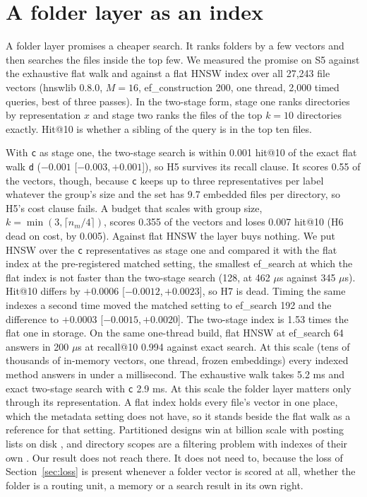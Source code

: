 \documentclass[11pt]{article}
\newcommand{\rep}[1]{\texttt{#1}}
\newcommand{\ci}[2]{[\ensuremath{#1},\,\ensuremath{#2}]}  %
\begin{document}
\section{A folder layer as an index}
\label{sec:systems}

A folder layer promises a cheaper search. It ranks folders by a few vectors and then searches the files inside the top few. We measured the promise on S5 against the exhaustive flat walk and against a flat HNSW index \citep{malkov2020hnsw} over all 27,243 file vectors (hnswlib 0.8.0, $M = 16$, ef\_construction 200, one thread, 2,000 timed queries, best of three passes). In the two-stage form, stage one ranks directories by representation $x$ and stage two ranks the files of the top $k = 10$ directories exactly. Hit@10 is whether a sibling of the query is in the top ten files.

With \rep{c} as stage one, the two-stage search is within 0.001 hit@10 of the exact flat walk \rep{d} ($-0.001$ \ci{-0.003}{+0.001}), so H5 survives its recall clause. It scores 0.55 of the vectors, though, because \rep{c} keeps up to three representatives per label whatever the group's size and the set has 9.7 embedded files per directory, so H5's cost clause fails. A budget that scales with group size, $k = \min(3, \lceil n_m / 4 \rceil)$, scores 0.355 of the vectors and loses 0.007 hit@10 (H6 dead on cost, by 0.005). Against flat HNSW the layer buys nothing. We put HNSW over the \rep{c} representatives as stage one and compared it with the flat index at the pre-registered matched setting, the smallest ef\_search at which the flat index is not faster than the two-stage search (128, at 462 $\mu$s against 345 $\mu$s). Hit@10 differs by $+0.0006$ \ci{-0.0012}{+0.0023}, so H7 is dead. Timing the same indexes a second time moved the matched setting to ef\_search 192 and the difference to $+0.0003$ \ci{-0.0015}{+0.0020}. The two-stage index is 1.53 times the flat one in storage. On the same one-thread build, flat HNSW at ef\_search 64 answers in 200 $\mu$s at recall@10 0.994 against exact search. At this scale (tens of thousands of in-memory vectors, one thread, frozen embeddings) every indexed method answers in under a millisecond. The exhaustive walk takes 5.2 ms and exact two-stage search with \rep{c} 2.9 ms. At this scale the folder layer matters only through its representation. A flat index holds every file's vector in one place, which the metadata setting does not have, so it stands beside the flat walk as a reference for that setting. Partitioned designs win at billion scale with posting lists on disk \citep{chen2021spann}, and directory scopes are a filtering problem with indexes of their own \citep{wang2026directoryaware,patel2024acorn}. Our result does not reach there. It does not need to, because the loss of Section~\ref{sec:loss} is present whenever a folder vector is scored at all, whether the folder is a routing unit, a memory or a search result in its own right.
\end{document}
